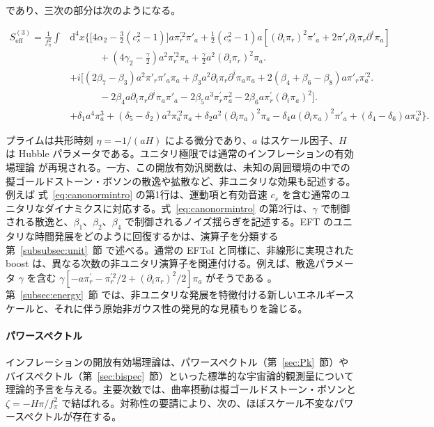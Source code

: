 \documentclass[a4paper,11pt]{ltjsarticle}
\numberwithin{equation}{section}
\def\pia{\pi_{a}}
\def\pir{\pi_{r}}
\newcommand{\dd}{\mathrm{d}}
\newcommand{\Eq}[1]{Eq.~(\ref{#1})}
\newcommand{\Sec}[1]{Sec.~\ref{#1}}
\renewcommand{\Eq}[1]{式~\eqref{#1}}
\renewcommand{\Sec}[1]{第~\ref{#1}~節}
\begin{document}
であり、三次の部分は次のようになる。

\begin{align}\label{eq:canonormcubintro}
S_{\mathrm{eff}}^{(3)} =   \frac{1}{f_\pi^2} \int & \dd^4 x \Big\{\Big[4 \alpha_2 -  \frac{3}{2} (c^2_s-1) \Big]  a \pir^{\prime2} \pi'_{a} +\frac{1}{2} (c^2_s-1) a \left[\left(\partial_i \pir \right)^2 \pi'_a + 2 \pi'_{r}	\partial_i \pir  \partial^i \pia \right] \\
& \qquad \quad + \left(4 \gamma_2 - \frac{\gamma}{2}\right)  a^2\pir^{\prime2} \pia	+ \frac{\gamma}{2} a^2	\left(\partial_i \pir \right)^2 \pia \nonumber \Big. \\
&+ i \Big[\left(2\beta_7-\beta_3\right) a^2 \pi'_{r} \pi'_{a} \pia + \beta_3 a^2 \partial_i \pir  \partial^i \pia \pia + 2(\beta_4+ \beta_6 - \beta_8) a \pi'_{r} \pia^{\prime2} \Big. \nonumber \\
& \qquad \quad - 2 \beta_4  a \partial_i \pir  \partial^i \pia \pi'_{a} - 2\beta_5 a^3 \pir^{\prime} \pia^2  - 2 \beta_6 a \pir^{\prime} (\partial_i\pia)^2 \Big]  \Big. \nonumber\\
&+\delta_1 a^4 \pia^3 + (\delta_5- \delta_2) a^2 \pia^{\prime2} \pia  + \delta_2 a^2 (\partial_i \pia)^2 \pia - \delta_4 a  (\partial_i \pia)^2 \pi'_a + (\delta_4-\delta_6) a \pia^{\prime3} \Big\}.  \nonumber
\end{align}

プライムは共形時刻 $\eta=-1/(aH)$ による微分であり、$a$ はスケール因子、$H$ は Hubble パラメータである。ユニタリ極限では通常のインフレーションの有効場理論 \cite{Cheung:2007st} が再現される。一方、この開放有効汎関数は、未知の周囲環境の中での擬ゴールドストーン・ボソンの散逸や拡散など、非ユニタリな効果も記述する。例えば \Eq{eq:canonormintro} の第1行は、運動項と有効音速 $c_s$ を含む通常のユニタリなダイナミクスに対応する。\Eq{eq:canonormintro} の第2行は、$\gamma$ で制御される散逸と、$\beta_1$、$\beta_2$、$\beta_4$ で制御されるノイズ揺らぎを記述する。EFT のユニタリな時間発展をどのように回復するかは、演算子を分類する \Sec{subsubsec:unit} で述べる。通常の EFToI \cite{Cheung:2007st} と同様に、非線形に実現された boost は、異なる次数の非ユニタリ演算子を関連付ける。例えば、散逸パラメータ $\gamma$ を含む $\gamma[-a\pir^{\prime}-\pir^{\prime2}/2+(\partial_i\pir)^2/2]\pia$ がそうである \cite{LopezNacir:2011kk}。\Sec{subsec:energy} では、非ユニタリな発展を特徴付ける新しいエネルギースケールと、それに伴う原始非ガウス性の発見的な見積もりを論じる。

\paragraph{パワースペクトル} インフレーションの開放有効場理論は、パワースペクトル（\Sec{sec:Pk}）やバイスペクトル（\Sec{sec:bispec}）といった標準的な宇宙論的観測量について理論的予言を与える。主要次数では、曲率摂動は擬ゴールドストーン・ボソンと $\zeta=-H\pi/f_\pi^2$ で結ばれる。対称性の要請により、次の、ほぼスケール不変なパワースペクトルが存在する。
\end{document}
